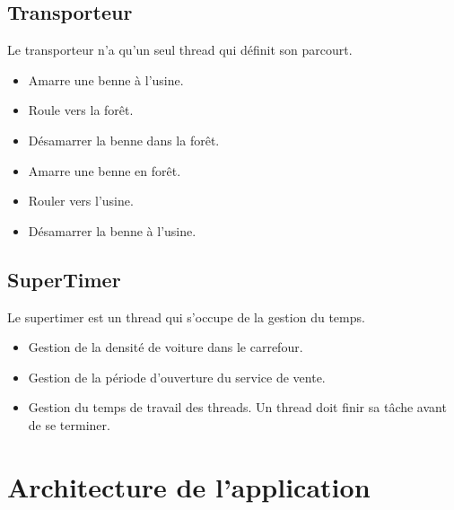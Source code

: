 \documentclass[a4paper, 12pt, oneside]{article}
\begin{document}
        \subsection{Transporteur}
            Le transporteur n'a qu'un seul thread qui définit son parcourt.
            \begin{itemize}
                \item Amarre une benne à l'usine.
                \item Roule vers la forêt.
                \item Désamarrer la benne dans la forêt.
                \item Amarre une benne en forêt.
                \item Rouler vers l'usine.
                \item Désamarrer la benne à l'usine.
            \end{itemize}
        \subsection{SuperTimer}
            Le supertimer est un thread qui s'occupe de la gestion du temps.
            \begin{itemize}
                \item Gestion de la densité de voiture dans le carrefour.
                \item Gestion de la période d'ouverture du service de vente.
                \item Gestion du temps de travail des threads. Un thread doit finir sa tâche avant de se terminer. 
            \end{itemize}
    \newpage
        \section{Architecture de l'application}
\end{document}
